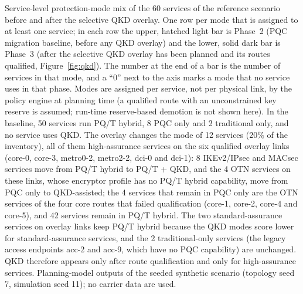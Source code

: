 Service-level protection-mode mix of the 60 services of the reference
scenario before and after the selective QKD overlay. One row per mode that is
assigned to at least one service; in each row the upper, hatched light bar is
Phase~2 (PQC migration baseline, before any QKD overlay) and the lower, solid
dark bar is Phase~3 (after the selective QKD overlay has been planned and its
routes qualified, Figure~\ref{fig:qkd}). The number at the end of a bar is
the number of services in that mode, and a ``0'' next to the axis marks a
mode that no service uses in that phase. Modes are assigned per service, not
per physical link, by the policy engine at planning time (a qualified route
with an unconstrained key reserve is assumed; run-time reserve-based demotion
is not shown here). In the baseline, 50 services run PQ/T hybrid, 8 PQC only
and 2 traditional only, and no service uses QKD. The overlay changes the mode
of 12 services (20\% of the inventory), all of them high-assurance services
on the six qualified overlay links (core-0, core-3, metro0-2, metro2-2, dci-0
and dci-1): 8 IKEv2/IPsec and MACsec services move from PQ/T hybrid to
PQ/T + QKD, and the 4 OTN services on these links, whose encryptor profile
has no PQ/T hybrid capability, move from PQC only to QKD-assisted; the 4
services that remain in PQC only are the OTN services of the four core routes
that failed qualification (core-1, core-2, core-4 and core-5), and 42
services remain in PQ/T hybrid. The two standard-assurance services on
overlay links keep PQ/T hybrid because the QKD modes score lower for
standard-assurance services, and the 2 traditional-only services (the legacy
access endpoints acc-2 and acc-9, which have no PQC capability) are
unchanged. QKD therefore appears only after route qualification and only for
high-assurance services. Planning-model outputs of the seeded synthetic
scenario (topology seed 7, simulation seed 11); no carrier data are used.

